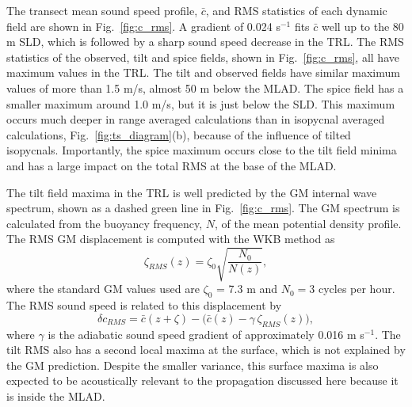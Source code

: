 \documentclass[preprint,NumberedRefs]{JASA}
\begin{document}
The transect mean sound speed profile, $\bar{c}$, and RMS statistics of each dynamic field are shown in Fig.~\ref{fig:c_rms}. A gradient of 0.024 s$^{-1}$ fits $\bar{c}$ well up to the 80 m SLD, which is followed by a sharp sound speed decrease in the TRL. The RMS statistics of the observed, tilt and spice fields, shown in Fig.~\ref{fig:c_rms}, all have maximum values in the TRL. The tilt and observed fields have similar maximum values of more than 1.5 m/s, almost 50 m below the MLAD. The spice field has a smaller maximum around 1.0 m/s, but it is just below the SLD. This maximum occurs much deeper in range averaged calculations than in isopycnal averaged calculations, Fig.~\ref{fig:ts_diagram}(b), because of the influence of tilted isopycnals.\citep{ferrari2000} Importantly, the spice maximum occurs close to the tilt field minima and has a large impact on the total RMS at the base of the MLAD.

The tilt field maxima in the TRL is well predicted by the GM internal wave spectrum, shown as a dashed green line in Fig.~\ref{fig:c_rms}. The GM spectrum is calculated from the buoyancy frequency, $N$, of the mean potential density profile. The RMS GM displacement is computed with the WKB method as
\begin{equation*}
    \zeta_{RMS}(z) = \zeta_0 \sqrt{\frac{N_0}{N(z)}},
\end{equation*}
where the standard GM values used are $\zeta_0$ = 7.3 m and $N_0=3$ cycles per hour. The RMS sound speed is related to this displacement by
\begin{equation*}
    \delta c_{RMS} = \bar{c}(z+\zeta)-\big(\bar{c}(z) - \gamma \, \zeta_{RMS}(z)\big),
\end{equation*}
where $\gamma$ is the adiabatic sound speed gradient of approximately 0.016 m s$^{-1}$. The tilt RMS also has a second local maxima at the surface, which is not explained by the GM prediction. Despite the smaller variance, this surface maxima is also expected to be acoustically relevant to the propagation discussed here because it is inside the MLAD.
\end{document}
